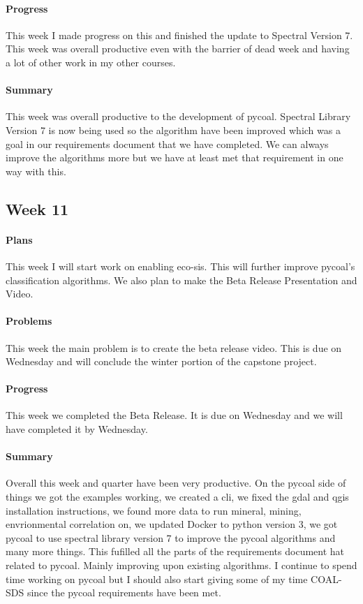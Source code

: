 \documentclass{article}
\begin{document}
\paragraph{Progress}
This week I made progress on this and finished the update to Spectral Version 7. This week was overall productive even with the barrier of dead week and having a lot of other work in my other courses. 
\paragraph{Summary}
This week was overall productive to the development of pycoal. Spectral Library Version 7 is now being used so the algorithm have been improved which was a goal in our requirements document that we have completed. We can always improve the algorithms more but we have at least met that requirement in one way with this.
\subsection{Week 11}
\paragraph{Plans}
This week I will start work on enabling eco-sis. This will further improve pycoal's classification algorithms. We also plan to make the Beta Release Presentation and Video. 
\paragraph{Problems}
This week the main problem is to create the beta release video. This is due  on Wednesday and will conclude the winter portion of the capstone project. 
\paragraph{Progress}
This week we completed the Beta Release. It is due on Wednesday and we will have completed it by Wednesday.
\paragraph{Summary}
Overall this week and quarter have been very productive.  On the pycoal side of things we got the examples working, we created a cli, we fixed the gdal and qgis installation instructions, we found more data to run mineral, mining, envrionmental correlation on, we updated Docker to python version 3, we got pycoal to use spectral library version 7 to improve the pycoal algorithms and many more things.  This fufilled all the parts of the requirements document hat related to pycoal. Mainly improving upon existing algorithms. I continue to spend time working on pycoal but I should also start giving some of my time COAL-SDS since the pycoal requirements have been met. 
\end{document}
